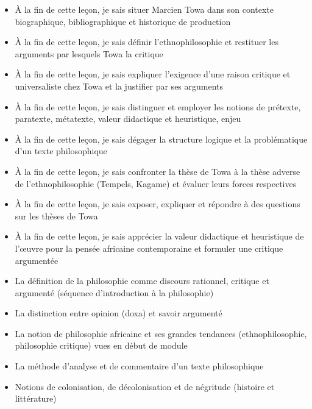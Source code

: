 \documentclass[11pt]{article}
\begin{document}
\begin{objectifs}
\begin{itemize}
\item À la fin de cette leçon, je sais situer Marcien Towa dans son contexte biographique, bibliographique et historique de production
\item À la fin de cette leçon, je sais définir l'ethnophilosophie et restituer les arguments par lesquels Towa la critique
\item À la fin de cette leçon, je sais expliquer l'exigence d'une raison critique et universaliste chez Towa et la justifier par ses arguments
\item À la fin de cette leçon, je sais distinguer et employer les notions de prétexte, paratexte, métatexte, valeur didactique et heuristique, enjeu
\item À la fin de cette leçon, je sais dégager la structure logique et la problématique d'un texte philosophique
\item À la fin de cette leçon, je sais confronter la thèse de Towa à la thèse adverse de l'ethnophilosophie (Tempels, Kagame) et évaluer leurs forces respectives
\item À la fin de cette leçon, je sais exposer, expliquer et répondre à des questions sur les thèses de Towa
\item À la fin de cette leçon, je sais apprécier la valeur didactique et heuristique de l'œuvre pour la pensée africaine contemporaine et formuler une critique argumentée
\end{itemize}
\end{objectifs}

\begin{prerequis}
\begin{itemize}
\item La définition de la philosophie comme discours rationnel, critique et argumenté (séquence d'introduction à la philosophie)
\item La distinction entre opinion (doxa) et savoir argumenté
\item La notion de philosophie africaine et ses grandes tendances (ethnophilosophie, philosophie critique) vues en début de module
\item La méthode d'analyse et de commentaire d'un texte philosophique
\item Notions de colonisation, de décolonisation et de négritude (histoire et littérature)
\end{itemize}
\end{prerequis}
\end{document}
